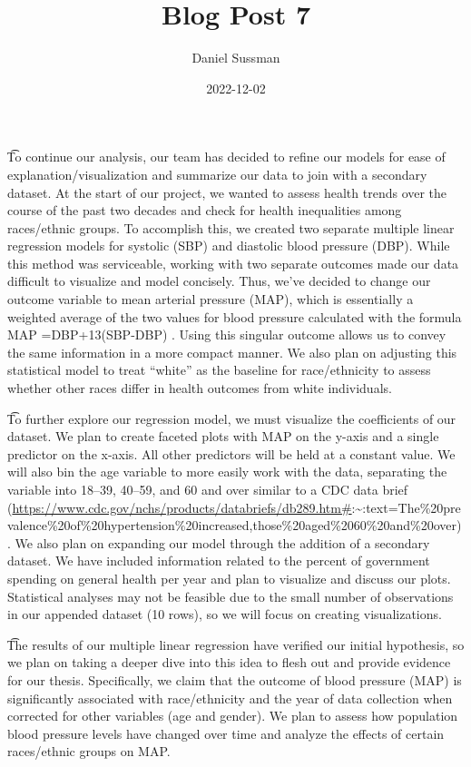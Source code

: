 \documentclass[
]{article}
\title{Blog Post 7}
\author{Daniel Sussman}
\date{2022-12-02}
\begin{document}
\maketitle

{
\setcounter{tocdepth}{3}
\tableofcontents
}
\t To continue our analysis, our team has decided to refine our models
for ease of explanation/visualization and summarize our data to join
with a secondary dataset. At the start of our project, we wanted to
assess health trends over the course of the past two decades and check
for health inequalities among races/ethnic groups. To accomplish this,
we created two separate multiple linear regression models for systolic
(SBP) and diastolic blood pressure (DBP). While this method was
serviceable, working with two separate outcomes made our data difficult
to visualize and model concisely. Thus, we've decided to change our
outcome variable to mean arterial pressure (MAP), which is essentially a
weighted average of the two values for blood pressure calculated with
the formula MAP =DBP+13(SBP-DBP) . Using this singular outcome allows us
to convey the same information in a more compact manner. We also plan on
adjusting this statistical model to treat ``white'' as the baseline for
race/ethnicity to assess whether other races differ in health outcomes
from white individuals.\n

\t To further explore our regression model, we must visualize the
coefficients of our dataset. We plan to create faceted plots with MAP on
the y-axis and a single predictor on the x-axis. All other predictors
will be held at a constant value. We will also bin the age variable to
more easily work with the data, separating the variable into 18--39,
40--59, and 60 and over similar to a CDC data brief
(\url{https://www.cdc.gov/nchs/products/databriefs/db289.htm\#}:\textasciitilde:text=The\%20prevalence\%20of\%20hypertension\%20increased,those\%20aged\%2060\%20and\%20over).
We also plan on expanding our model through the addition of a secondary
dataset. We have included information related to the percent of
government spending on general health per year and plan to visualize and
discuss our plots. Statistical analyses may not be feasible due to the
small number of observations in our appended dataset (10 rows), so we
will focus on creating visualizations. \n

\t The results of our multiple linear regression have verified our
initial hypothesis, so we plan on taking a deeper dive into this idea to
flesh out and provide evidence for our thesis. Specifically, we claim
that the outcome of blood pressure (MAP) is significantly associated
with race/ethnicity and the year of data collection when corrected for
other variables (age and gender). We plan to assess how population blood
pressure levels have changed over time and analyze the effects of
certain races/ethnic groups on MAP.
\end{document}
